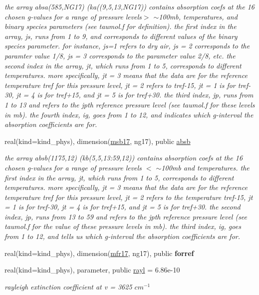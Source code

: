 \begin{Indent}
\begin{DoxyCompactItemize}
\begin{DoxyCompactList}\small\item\em the array absa(585,\+N\+G17) (ka((9,5,13,\+N\+G17)) contains absorption coefs at the 16 chosen g-\/values for a range of pressure levels$>$ $\sim$100mb, temperatures, and binary species parameters (see taumol.\+f for definition). the first index in the array, js, runs from 1 to 9, and corresponds to different values of the binary species parameter. for instance, js=1 refers to dry air, js = 2 corresponds to the paramter value 1/8, js = 3 corresponds to the parameter value 2/8, etc. the second index in the array, jt, which runs from 1 to 5, corresponds to different temperatures. more specifically, jt = 3 means that the data are for the reference temperature tref for this pressure level, jt = 2 refers to tref-\/15, jt = 1 is for tref-\/30, jt = 4 is for tref+15, and jt = 5 is for tref+30. the third index, jp, runs from 1 to 13 and refers to the jpth reference pressure level (see taumol.\+f for these levels in mb). the fourth index, ig, goes from 1 to 12, and indicates which g-\/interval the absorption coefficients are for. \end{DoxyCompactList}\item 
real(kind=kind\+\_\+phys), dimension(\hyperlink{group__module__radsw__kgbnn_gafbb056103147b8e5f4d5a8af40420ea0}{msb17}, ng17), public \hyperlink{group__module__radsw__kgbnn_gaef407d13a88f5e1bfd20652ab3010e2f}{absb}
\begin{DoxyCompactList}\small\item\em the array absb(1175,12) (kb(5,5,13\+:59,12)) contains absorption coefs at the 16 chosen g-\/values for a range of pressure levels $<$ $\sim$100mb and temperatures. the first index in the array, jt, which runs from 1 to 5, corresponds to different temperatures. more specifically, jt = 3 means that the data are for the reference temperature tref for this pressure level, jt = 2 refers to the temperature tref-\/15, jt = 1 is for tref-\/30, jt = 4 is for tref+15, and jt = 5 is for tref+30. the second index, jp, runs from 13 to 59 and refers to the jpth reference pressure level (see taumol.\+f for the value of these pressure levels in mb). the third index, ig, goes from 1 to 12, and tells us which g-\/interval the absorption coefficients are for. \end{DoxyCompactList}\item 
real(kind=kind\+\_\+phys), dimension(\hyperlink{group__module__radsw__kgbnn_gadd099d7e1b5e7767d77de6d96673e26f}{mfr17}, ng17), public {\bfseries forref}
\item 
real(kind=kind\+\_\+phys), parameter, public \hyperlink{group__module__radsw__kgbnn_gaa4862628a06e0e08d1db5637bc62ffa5}{rayl} = 6.\+86e-\/10
\begin{DoxyCompactList}\small\item\em rayleigh extinction coefficient at v = 3625 $cm^{-1}$ \end{DoxyCompactList}\end{DoxyCompactItemize}
\end{Indent}
